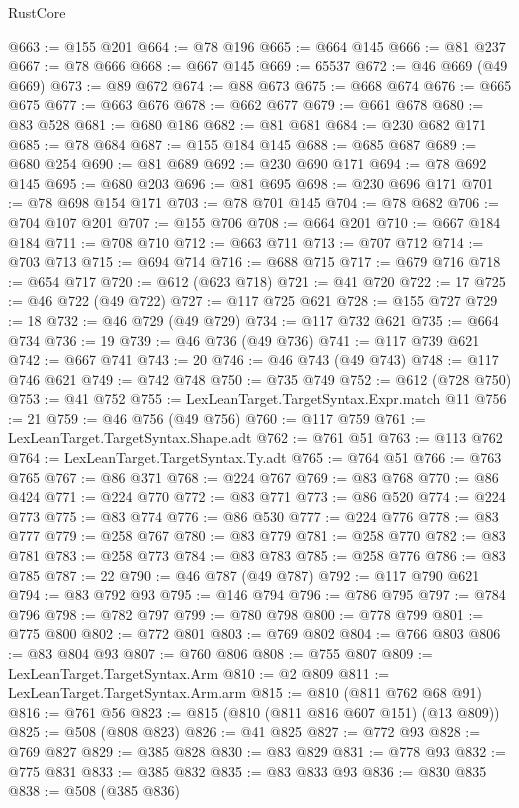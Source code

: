 \begin{lexlean}{RustCore}
\begin{coremodule}
@663 := @155 @201
@664 := @78 @196
@665 := @664 @145
@666 := @81 @237
@667 := @78 @666
@668 := @667 @145
@669 := 65537
@672 := @46 @669 (@49 @669)
@673 := @89 @672
@674 := @88 @673
@675 := @668 @674
@676 := @665 @675
@677 := @663 @676
@678 := @662 @677
@679 := @661 @678
@680 := @83 @528
@681 := @680 @186
@682 := @81 @681
@684 := @230 @682 @171
@685 := @78 @684
@687 := @155 @184 @145
@688 := @685 @687
@689 := @680 @254
@690 := @81 @689
@692 := @230 @690 @171
@694 := @78 @692 @145
@695 := @680 @203
@696 := @81 @695
@698 := @230 @696 @171
@701 := @78 @698 @154 @171
@703 := @78 @701 @145
@704 := @78 @682
@706 := @704 @107 @201
@707 := @155 @706
@708 := @664 @201
@710 := @667 @184 @184
@711 := @708 @710
@712 := @663 @711
@713 := @707 @712
@714 := @703 @713
@715 := @694 @714
@716 := @688 @715
@717 := @679 @716
@718 := @654 @717
@720 := @612 (@623 @718)
@721 := @41 @720
@722 := 17
@725 := @46 @722 (@49 @722)
@727 := @117 @725 @621
@728 := @155 @727
@729 := 18
@732 := @46 @729 (@49 @729)
@734 := @117 @732 @621
@735 := @664 @734
@736 := 19
@739 := @46 @736 (@49 @736)
@741 := @117 @739 @621
@742 := @667 @741
@743 := 20
@746 := @46 @743 (@49 @743)
@748 := @117 @746 @621
@749 := @742 @748
@750 := @735 @749
@752 := @612 (@728 @750)
@753 := @41 @752
@755 := LexLeanTarget.TargetSyntax.Expr.match @11
@756 := 21
@759 := @46 @756 (@49 @756)
@760 := @117 @759
@761 := LexLeanTarget.TargetSyntax.Shape.adt
@762 := @761 @51
@763 := @113 @762
@764 := LexLeanTarget.TargetSyntax.Ty.adt
@765 := @764 @51
@766 := @763 @765
@767 := @86 @371
@768 := @224 @767
@769 := @83 @768
@770 := @86 @424
@771 := @224 @770
@772 := @83 @771
@773 := @86 @520
@774 := @224 @773
@775 := @83 @774
@776 := @86 @530
@777 := @224 @776
@778 := @83 @777
@779 := @258 @767
@780 := @83 @779
@781 := @258 @770
@782 := @83 @781
@783 := @258 @773
@784 := @83 @783
@785 := @258 @776
@786 := @83 @785
@787 := 22
@790 := @46 @787 (@49 @787)
@792 := @117 @790 @621
@794 := @83 @792 @93
@795 := @146 @794
@796 := @786 @795
@797 := @784 @796
@798 := @782 @797
@799 := @780 @798
@800 := @778 @799
@801 := @775 @800
@802 := @772 @801
@803 := @769 @802
@804 := @766 @803
@806 := @83 @804 @93
@807 := @760 @806
@808 := @755 @807
@809 := LexLeanTarget.TargetSyntax.Arm
@810 := @2 @809
@811 := LexLeanTarget.TargetSyntax.Arm.arm
@815 := @810 (@811 @762 @68 @91)
@816 := @761 @56
@823 := @815 (@810 (@811 @816 @607 @151) (@13 @809))
@825 := @508 (@808 @823)
@826 := @41 @825
@827 := @772 @93
@828 := @769 @827
@829 := @385 @828
@830 := @83 @829
@831 := @778 @93
@832 := @775 @831
@833 := @385 @832
@835 := @83 @833 @93
@836 := @830 @835
@838 := @508 (@385 @836)

\end{coremodule}
\end{lexlean}
